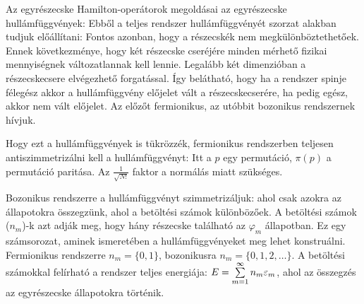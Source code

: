    Az egyrészecske Hamilton-operátorok megoldásai az egyrészecske hullámfüggvények: 
   Ebből a teljes rendszer hullámfüggvényét szorzat alakban tudjuk előállítani:
   Fontos azonban, hogy a részecskék nem megkülönböztethetőek. Ennek következménye, hogy két részecske cseréjére minden mérhető fizikai mennyiségnek változatlannak kell lennie. Legalább két dimenzióban a részecskecsere elvégezhető forgatással. Így belátható, hogy ha a rendszer spinje félegész akkor a hullámfüggvény előjelet vált a részecskecserére, ha pedig egész, akkor nem vált előjelet. Az előzőt fermionikus, az utóbbit bozonikus rendszernek hívjuk. 
   
   Hogy ezt a hullámfüggvények is tükrözzék, fermionikus rendszerben teljesen antiszimmetrizálni kell a hullámfüggvényt:
   Itt a $p$ egy permutáció, $\pi(p)$ a permutáció paritása. Az $\frac{1}{\sqrt{N!}}$ faktor a normálás miatt szükséges.
   
   Bozonikus rendszerre a hullámfüggvényt szimmetrizáljuk:
   ahol csak azokra az állapotokra összegzünk, ahol a betöltési számok különbözőek. A betöltési számok ($n_m$)-k azt adják meg, hogy hány részecske található az $\varphi_m$ állapotban. Ez egy számsorozat, aminek ismeretében a hullámfüggvényeket meg lehet konstruálni. Fermionikus rendszerre $n_m=\{0,1\}$, bozonikusra $n_m=\{0,1,2,\dots\}$. A betöltési számokkal felírható a rendszer teljes energiája: $E=\sum\limits_{m=1}^{\infty}n_m\varepsilon_m$, ahol az összegzés az egyrészecske állapotokra történik.
   
